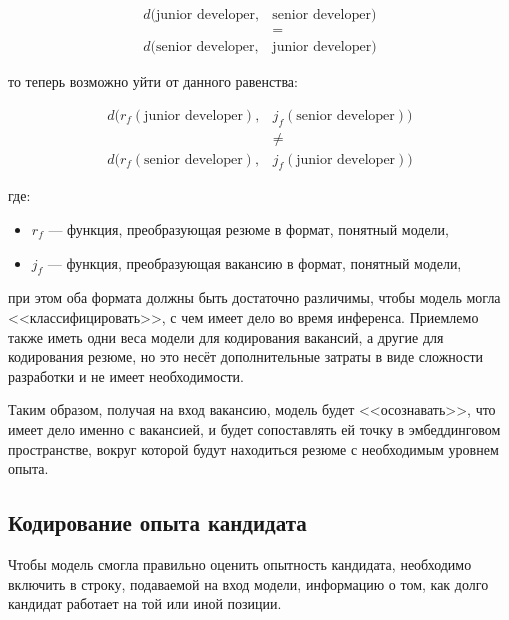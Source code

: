\documentclass[14pt]{mmcs_article}
\begin{document}
\begin{equation}
  \label{eq:assymetric_search_problem}
  \begin{aligned}
    d(\text{junior developer}, & \text{senior developer}) \\
                               & =                        \\
    d(\text{senior developer}, & \text{junior developer})
  \end{aligned}
\end{equation}

то теперь возможно уйти от данного равенства:

\begin{equation}
  \label{eq:solved_assymetric_search_problem}
  \begin{aligned}
    d(r_{f}(\text{junior developer}), & j_{f}(\text{senior developer})) \\
                                      & \neq                            \\
    d(r_{f}(\text{senior developer}), & j_{f}(\text{junior developer}))
  \end{aligned}
\end{equation}

где:
\begin{itemize}
  \item $r_{f}$ --- функция, преобразующая резюме в формат, понятный модели,
  \item $j_{f}$ --- функция, преобразующая вакансию в формат, понятный модели,
\end{itemize}

при этом оба формата должны быть достаточно различимы, чтобы модель могла <<классифицировать>>,  с чем имеет дело во время инференса. Приемлемо также иметь одни веса модели для кодирования вакансий, а другие для кодирования резюме, но это несёт дополнительные затраты в виде сложности разработки и не имеет необходимости.

Таким образом, получая на вход вакансию, модель будет <<осознавать>>, что имеет дело именно с вакансией, и будет сопоставлять ей точку в эмбеддинговом пространстве, вокруг которой будут находиться резюме с необходимым уровнем опыта.

\subsection{Кодирование опыта кандидата}

Чтобы модель смогла правильно оценить опытность кандидата, необходимо включить в строку, подаваемой на вход модели, информацию о том, как долго кандидат работает на той или иной позиции.
\end{document}
